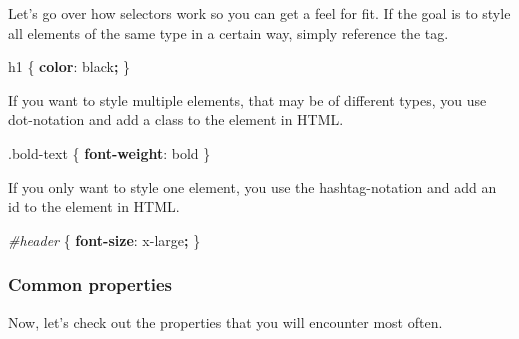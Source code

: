 \documentclass[
]{article}
\newenvironment{Shaded}{\begin{snugshade}}{\end{snugshade}}
\newcommand{\ConstantTok}[1]{\textcolor[rgb]{0.00,0.00,0.00}{#1}}
\newcommand{\DecValTok}[1]{\textcolor[rgb]{0.00,0.00,0.81}{#1}}
\newcommand{\FunctionTok}[1]{\textcolor[rgb]{0.00,0.00,0.00}{#1}}
\newcommand{\KeywordTok}[1]{\textcolor[rgb]{0.13,0.29,0.53}{\textbf{#1}}}
\newcommand{\NormalTok}[1]{#1}
\newcommand{\OperatorTok}[1]{\textcolor[rgb]{0.81,0.36,0.00}{\textbf{#1}}}
\newcommand{\PreprocessorTok}[1]{\textcolor[rgb]{0.56,0.35,0.01}{\textit{#1}}}
\begin{document}
Let's go over how selectors work so you can get a feel for fit. If the goal is to style all elements of the same type in a certain way, simply reference the tag.

\begin{Shaded}
\begin{Highlighting}[]
\NormalTok{h1 \{}
  \KeywordTok{color}\NormalTok{: }\ConstantTok{black}\OperatorTok{;}
\NormalTok{\}}
\end{Highlighting}
\end{Shaded}

If you want to style multiple elements, that may be of different types, you use dot-notation and add a class to the element in HTML.

\begin{Shaded}
\begin{Highlighting}[]
\FunctionTok{.bold{-}text}\NormalTok{ \{                           }
  \KeywordTok{font{-}weight}\NormalTok{: }\DecValTok{bold}
\NormalTok{\}}
\end{Highlighting}
\end{Shaded}

If you only want to style one element, you use the hashtag-notation and add an id to the element in HTML.

\begin{Shaded}
\begin{Highlighting}[]
\PreprocessorTok{\#header}\NormalTok{ \{                           }
  \KeywordTok{font{-}size}\NormalTok{: }\DecValTok{x{-}large}\OperatorTok{;}
\NormalTok{\}}
\end{Highlighting}
\end{Shaded}

\hypertarget{common-properties}{%
\subsubsection*{Common properties}\label{common-properties}}

Now, let's check out the properties that you will encounter most often.
\end{document}
